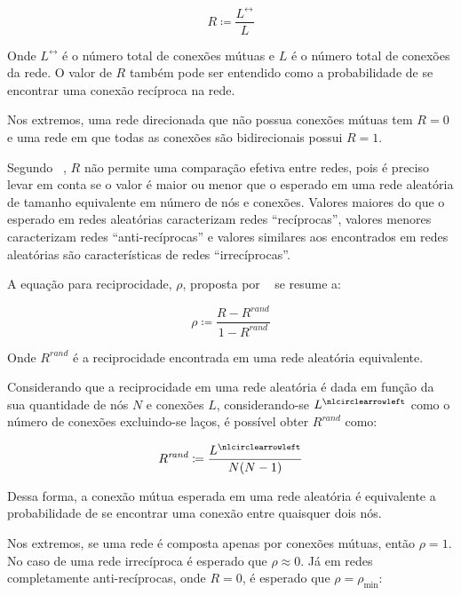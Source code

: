 \documentclass[12pt,a4paper]{article}
\theoremstyle{hypo}
\newcommand{\defn}{\coloneqq} %
\newcommand{\noloop}[1]{#1^\nlcirclearrowleft} %
\newcommand{\linkboth}[1]{#1^\leftrightarrow} %
\begin{document}
\begin{equation} \label{eq:reciprocidade}
R \defn \frac{\linkboth{L}}{L}
\end{equation}

Onde $\linkboth{L}$ é o número total de conexões mútuas e $L$ é o número total de conexões da rede. O valor de $R$ também pode ser entendido como a probabilidade de se encontrar uma conexão recíproca na rede.

Nos extremos, uma rede direcionada que não possua conexões mútuas tem $R = 0$ e uma rede em que todas as conexões são bidirecionais possui $R = 1$.

Segundo ~, $R$ não permite uma comparação efetiva entre redes, pois é preciso levar em conta se o valor é maior ou menor que o esperado em uma rede aleatória de tamanho equivalente em número de nós e conexões. Valores maiores do que o esperado em redes aleatórias caracterizam redes \enquote{recíprocas}, valores menores caracterizam redes \enquote{anti-recíprocas} e valores similares aos encontrados em redes aleatórias são características de redes \enquote{irrecíprocas}.

A equação para reciprocidade, $\rho$, proposta por ~ se resume a:

\begin{equation} \label{eq:reciprocidade-rand}
\rho \defn \frac{R - R^\textit{rand}}{1 - R^\textit{rand}}
\end{equation}

Onde $R^\textit{rand}$ é a reciprocidade encontrada em uma rede aleatória equivalente.

Considerando que a reciprocidade em uma rede aleatória é dada em função da sua quantidade de nós $N$ e conexões $L$, considerando-se $\noloop{L}$ como o número de conexões excluindo-se laços, é possível obter $R^\textit{rand}$ como:

\begin{equation}
R^\textit{rand} \defn \frac{\noloop{L}}{N(N - 1)}
\end{equation}

Dessa forma, a conexão mútua esperada em uma rede aleatória é equivalente a probabilidade de se encontrar uma conexão entre quaisquer dois nós. 

Nos extremos, se uma rede é composta apenas por conexões mútuas, então $\rho = 1$. No caso de uma rede irrecíproca é esperado que $\rho \approx 0$. Já em redes completamente anti-recíprocas, onde $R = 0$, é esperado que $\rho = \rho_\text{min}$:
\end{document}
